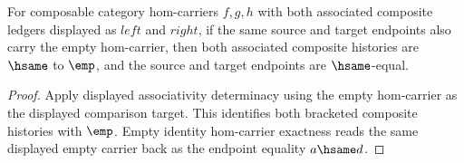 \begin{theorem}
\label{thm:category-hom-carrier-comp-assoc-empty-result-components}
For composable category hom-carriers \(f,g,h\) with both associated composite
ledgers displayed as \(left\) and \(right\), if the same source and target
endpoints also carry the empty hom-carrier, then both associated composite
histories are \(\hsame\) to \(\emp\), and the source and target endpoints are
\(\hsame\)-equal.
\end{theorem}
\begin{proof}
Apply displayed associativity determinacy using the empty hom-carrier as the
displayed comparison target. This identifies both bracketed composite histories
with \(\emp\). Empty identity hom-carrier exactness reads the same displayed
empty carrier back as the endpoint equality \(a\hsame d\).
\end{proof}
